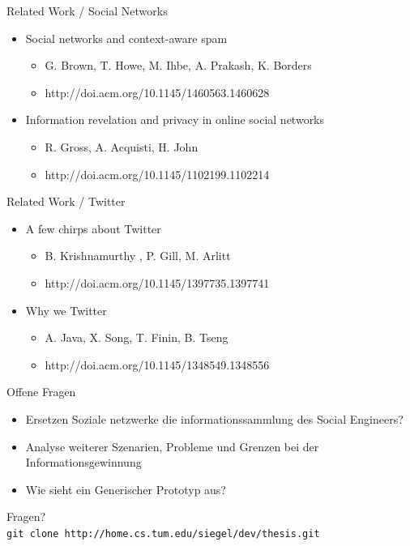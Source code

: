 \documentclass[11pt]{beamer}
\begin{document}
\begin{frame}{Related Work / Social Networks}
  \begin{itemize}
    \item Social networks and context-aware spam
    \begin{itemize}
      \item  G. Brown, T. Howe, M. Ihbe, A. Prakash, K. Borders
      \item http://doi.acm.org/10.1145/1460563.1460628
    \end{itemize}
    \item Information revelation and privacy in online social networks
    \begin{itemize}
      \item R. Gross, A. Acquisti, H.  John
      \item http://doi.acm.org/10.1145/1102199.1102214
    \end{itemize}
  \end{itemize}
\end{frame}

\begin{frame}{Related Work / Twitter}
  \begin{itemize}
    \item A few chirps about Twitter
    \begin{itemize}
      \item B. Krishnamurthy , P. Gill, M. Arlitt
      \item http://doi.acm.org/10.1145/1397735.1397741
    \end{itemize}
    \item Why we Twitter
    \begin{itemize}
      \item A. Java, X. Song, T. Finin, B. Tseng
      \item http://doi.acm.org/10.1145/1348549.1348556
    \end{itemize}
  \end{itemize}
\end{frame}

\begin{frame}{Offene Fragen}
  \begin{itemize}
    \item Ersetzen Soziale netzwerke die informationssammlung des Social Engineers?
    \item Analyse weiterer Szenarien, Probleme und Grenzen bei der Informationsgewinnung
    \item Wie sieht ein Generischer Prototyp aus?
  \end{itemize}
\end{frame}

\begin{frame}
  \begin{center}
  {\Huge Fragen?}\\

\vfill
  \texttt{git clone http://home.cs.tum.edu/siegel/dev/thesis.git}
  \end{center}
\end{frame}
\end{document}

